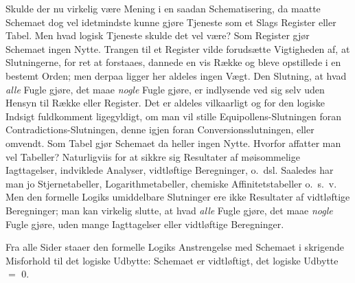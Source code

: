 \documentclass[12pt]{book}
\newcommand{\opage}[1]{\marginnote{\footnotesize\textit{[#1]}}}
\begin{document}
Skulde der nu virkelig være Mening i en saadan Schematisering, da maatte Schemaet dog vel idetmindste kunne gjøre Tjeneste som et Slags Register eller Tabel. Men hvad logisk Tjeneste skulde det vel være? Som Register gjør Schemaet ingen Nytte. Trangen til et Register vilde forudsætte Vigtigheden af, at Slutningerne, for ret at forstaaes, dannede en vis Række og bleve opstillede i en bestemt Orden; men derpaa ligger her aldeles ingen Vægt. Den Slutning, at hvad \emph{alle} Fugle gjøre, det maae \emph{nogle} Fugle gjøre, er indlysende ved sig selv uden Hensyn til Række eller Register. Det er aldeles vilkaarligt og for den logiske Indsigt fuldkomment ligegyldigt, om man vil stille Equipollens-Slutningen foran Contradictions-Slutningen, denne igjen foran Conversionsslutningen, eller omvendt. Som Tabel gjør Schemaet da heller ingen Nytte. Hvorfor affatter man vel Tabeller? Naturligviis for at sikkre sig Resultater af møisommelige Iagttagelser, indviklede Analyser, vidtløftige Beregninger, o.\ dsl. Saaledes har man jo Stjernetabeller, Logarithmetabeller, chemiske Affinitetstabeller o.\ s.\ v.
\opage{302}Men den formelle Logiks umiddelbare Slutninger ere ikke Resultater af vidtløftige Beregninger; man kan virkelig slutte, at hvad \emph{alle} Fugle gjøre, det maae \emph{nogle} Fugle gjøre, uden mange Iagttagelser eller vidtløftige Beregninger.

Fra alle Sider staaer den formelle Logiks Anstrengelse med Schemaet i skrigende Misforhold til det logiske Udbytte: Schemaet er vidtløftigt, det logiske Udbytte $=$ 0.
\end{document}
